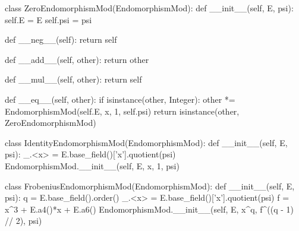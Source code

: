 \begin{sagecode}
class ZeroEndomorphismMod(EndomorphismMod):
    def __init__(self, E, psi):
        self.E = E
        self.psi = psi

    def __neg__(self):
        return self

    def __add__(self, other):
        return other

    def __mul__(self, other):
        return self

    def __eq__(self, other):
        if isinstance(other, Integer):
            other *= EndomorphismMod(self.E, x, 1, self.psi)
        return isinstance(other, ZeroEndomorphismMod)
\end{sagecode}

\begin{sagecode}
class IdentityEndomorphismMod(EndomorphismMod):
    def __init__(self, E, psi):
        _.<x> = E.base_field()['x'].quotient(psi)
        EndomorphismMod.__init__(self, E, x, 1, psi)
\end{sagecode}

\begin{sagecode}
class FrobeniusEndomorphismMod(EndomorphismMod):
    def __init__(self, E, psi):
        q = E.base_field().order()
        _.<x> = E.base_field()['x'].quotient(psi)
        f = x^3 + E.a4()*x + E.a6()
        EndomorphismMod.__init__(self, E, x^q, f^((q - 1) // 2), psi)
\end{sagecode}
